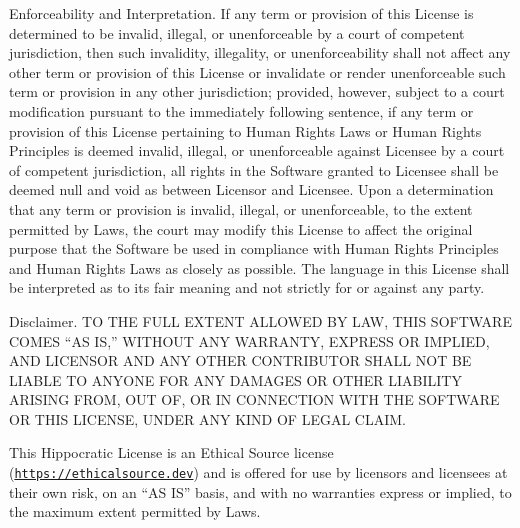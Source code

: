 \begin{DoxyItemize}
\item Enforceability and Interpretation. If any term or provision of this License is determined to be invalid, illegal, or unenforceable by a court of competent jurisdiction, then such invalidity, illegality, or unenforceability shall not affect any other term or provision of this License or invalidate or render unenforceable such term or provision in any other jurisdiction; provided, however, subject to a court modification pursuant to the immediately following sentence, if any term or provision of this License pertaining to Human Rights Laws or Human Rights Principles is deemed invalid, illegal, or unenforceable against Licensee by a court of competent jurisdiction, all rights in the Software granted to Licensee shall be deemed null and void as between Licensor and Licensee. Upon a determination that any term or provision is invalid, illegal, or unenforceable, to the extent permitted by Laws, the court may modify this License to affect the original purpose that the Software be used in compliance with Human Rights Principles and Human Rights Laws as closely as possible. The language in this License shall be interpreted as to its fair meaning and not strictly for or against any party.
\item Disclaimer. TO THE FULL EXTENT ALLOWED BY LAW, THIS SOFTWARE COMES “\+AS IS,” WITHOUT ANY WARRANTY, EXPRESS OR IMPLIED, AND LICENSOR AND ANY OTHER CONTRIBUTOR SHALL NOT BE LIABLE TO ANYONE FOR ANY DAMAGES OR OTHER LIABILITY ARISING FROM, OUT OF, OR IN CONNECTION WITH THE SOFTWARE OR THIS LICENSE, UNDER ANY KIND OF LEGAL CLAIM.
\end{DoxyItemize}

This Hippocratic License is an Ethical Source license (\href{https://ethicalsource.dev}{\texttt{https:\+/\+/\+ethicalsource.\+dev}}) and is offered for use by licensors and licensees at their own risk, on an “\+AS IS” basis, and with no warranties express or implied, to the maximum extent permitted by Laws. 